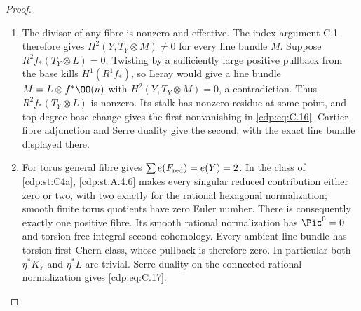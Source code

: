 \begin{proof}

\begin{enumerate}[label={$\langle1\rangle$\arabic*.},leftmargin=*]
\item The divisor of any fibre is nonzero and effective. The index argument C.1 therefore gives $H^2(Y,T_Y\otimes M)\ne0$ for every line bundle $M$. Suppose $R^2f_*(T_Y\otimes L)=0$. Twisting by a sufficiently large positive pullback from the base kills $H^1(R^1f_*)$, so Leray would give a line bundle $M=L\otimes f^*\OO(n)$ with $H^2(Y,T_Y\otimes M)=0$, a contradiction. Thus $R^2f_*(T_Y\otimes L)$ is nonzero. Its stalk has nonzero residue at some point, and top-degree base change gives the first nonvanishing in \eqref{cdp:eq:C.16}. Cartier-fibre adjunction and Serre duality give the second, with the exact line bundle displayed there.

\item For torus general fibre  gives $\sum e(F_{\rm red})=e(Y)=2$. In the class of \ref{cdp:st:C4a}, \ref{cdp:st:A.4.6} makes every singular reduced contribution either zero or two, with two exactly for the rational hexagonal normalization; smooth finite torus quotients have zero Euler number. There is consequently exactly one positive fibre. Its smooth rational normalization has $\Pic^0=0$ and torsion-free integral second cohomology. Every ambient line bundle has torsion first Chern class, whose pullback is therefore zero. In particular both $\eta^*K_Y$ and $\eta^*L$ are trivial. Serre duality on the connected rational normalization gives \eqref{cdp:eq:C.17}.

\end{enumerate}
\end{proof}
